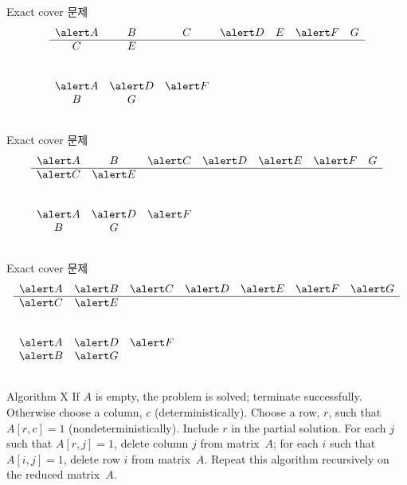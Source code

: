 \documentclass{beamer}
\begin{document}
%
\begin{frame}{Exact cover 문제} 
  $$
  \begin{array}{ccccccc}
    \alert A & B & C & \alert D & E & \alert F & G\\
    \hline
    C & E &&&&&\\
    &&&&&&\\
    &&&&&&\\
    \alert A & \alert D & \alert F &&&&\\
    B & G &&&&&\\
    &&&&&&
  \end{array}
  $$
\end{frame}

%
\begin{frame}{Exact cover 문제} 
  $$
  \begin{array}{ccccccc}
    \alert A & B & \alert C & \alert D & \alert E & \alert F & G\\
    \hline
    \alert C & \alert E &&&&&\\
    &&&&&&\\
    &&&&&&\\
    \alert A & \alert D & \alert F &&&&\\
    B & G &&&&&\\
    &&&&&&
  \end{array}
  $$
\end{frame}

%
\begin{frame}{Exact cover 문제} 
  $$
  \begin{array}{ccccccc}
    \alert A & \alert B & \alert C & \alert D & \alert E & \alert F & \alert G\\
    \hline
    \alert C & \alert E &&&&&\\
    &&&&&&\\
    &&&&&&\\
    \alert A & \alert D & \alert F &&&&\\
    \alert B & \alert G &&&&&\\
    &&&&&&
  \end{array}
  $$
\end{frame}

%
\begin{frame}[fragile]{Algorithm X}
  \begingroup\obeylines
  \baselineskip10pt
If $A$ is empty, the problem is solved; terminate successfully.
Otherwise choose a column, $c$ (deterministically).
Choose a row, $r$, such that $A[r,c]=1$ (nondeterministically).
Include $r$ in the partial solution.
For each $j$ such that $A[r,j]=1$,
\qquad delete column $j$ from matrix~$A$;
\qquad for each $i$ such that $A[i,j]=1$,
\qquad\qquad delete row $i$ from matrix~$A$.
Repeat this algorithm recursively on the reduced matrix~$A$.
\endgroup
\end{frame}
\end{document}

